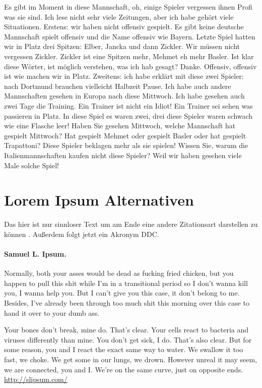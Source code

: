 \documentclass[12pt,        %
  english,ngerman,          %
  paper=a4,                 %
  captions=tablesignature,  %
  listof=numbered,          %
  bibliography=totoc,       %
  headings=small,           %
  headinclude=false,        %
  footinclude=false,        %
  parskip=half-,            %
  oneside,                  %
  DIV=12                    %
]{styles/colireport}
\begin{document}
Es gibt im Moment in diese Mannschaft, oh, einige Spieler vergessen ihnen Profi was sie sind. Ich lese nicht sehr viele Zeitungen, aber ich habe gehört viele Situationen. Erstens: wir haben nicht offensiv gespielt. Es gibt keine deutsche Mannschaft spielt offensiv und die Name offensiv wie Bayern. Letzte Spiel hatten wir in Platz drei Spitzen: Elber, Jancka und dann Zickler. Wir müssen nicht vergessen Zickler. Zickler ist eine Spitzen mehr, Mehmet eh mehr Basler. Ist klar diese Wörter, ist möglich verstehen, was ich hab gesagt? Danke. Offensiv, offensiv ist wie machen wir in Platz. Zweitens: ich habe erklärt mit diese zwei Spieler: nach Dortmund brauchen vielleicht Halbzeit Pause. Ich habe auch andere Mannschaften gesehen in Europa nach diese Mittwoch. Ich habe gesehen auch zwei Tage die Training. Ein Trainer ist nicht ein Idiot! Ein Trainer sei sehen was passieren in Platz. In diese Spiel es waren zwei, drei diese Spieler waren schwach wie eine Flasche leer! Haben Sie gesehen Mittwoch, welche Mannschaft hat gespielt Mittwoch? Hat gespielt Mehmet oder gespielt Basler oder hat gespielt Trapattoni? Diese Spieler beklagen mehr als sie spielen! Wissen Sie, warum die Italienmannschaften kaufen nicht diese Spieler? Weil wir haben gesehen viele Male solche Spiel! \cite{Bottou2014}


\section*{Lorem Ipsum Alternativen}

Das hier ist nur sinnloser Text um am Ende eine andere Zitationsart darstellen zu können \citealp{Wartena2015}. Außerdem folgt jetzt ein Akronym \ac{DDC}.

\paragraph*{Samuel L. Ipsum.}  Normally, both your asses would be dead as fucking fried chicken, but you happen to pull this shit while I'm in a transitional period so I don't wanna kill you, I wanna help you. But I can't give you this case, it don't belong to me. Besides, I've already been through too much shit this morning over this case to hand it over to your dumb ass.

Your bones don't break, mine do. That's clear. Your cells react to bacteria and viruses differently than mine. You don't get sick, I do. That's also clear. But for some reason, you and I react the exact same way to water. We swallow it too fast, we choke. We get some in our lungs, we drown. However unreal it may seem, we are connected, you and I. We're on the same curve, just on opposite ends.
\url{http://slipsum.com/}
\end{document}
